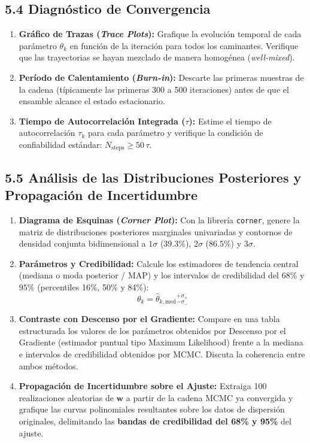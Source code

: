 \documentclass[11pt,a4paper]{article}
\begin{document}
\subsection{5.4 Diagnóstico de Convergencia}
\begin{enumerate}[leftmargin=*,itemsep=2pt]
    \item \textbf{Gráfico de Trazas (\textit{Trace Plots}):} Grafique la evolución temporal de cada parámetro $\theta_k$ en función de la iteración para todos los caminantes. Verifique que las trayectorias se hayan mezclado de manera homogénea (\textit{well-mixed}).
    \item \textbf{Período de Calentamiento (\textit{Burn-in}):} Descarte las primeras muestras de la cadena (típicamente las primeras 300 a 500 iteraciones) antes de que el ensamble alcance el estado estacionario.
    \item \textbf{Tiempo de Autocorrelación Integrada ($\tau$):} Estime el tiempo de autocorrelación $\tau_k$ para cada parámetro y verifique la condición de confiabilidad estándar: $N_{\text{steps}} \ge 50\,\tau$.
\end{enumerate}

\subsection{5.5 Análisis de las Distribuciones Posteriores y Propagación de Incertidumbre}
\begin{enumerate}[leftmargin=*,itemsep=3pt]
    \item \textbf{Diagrama de Esquinas (\textit{Corner Plot}):} Con la librería \texttt{corner}, genere la matriz de distribuciones posteriores marginales univariadas y contornos de densidad conjunta bidimensional a $1\sigma$ ($39.3\%$), $2\sigma$ ($86.5\%$) y $3\sigma$.
    \item \textbf{Parámetros y Credibilidad:} Calcule los estimadores de tendencia central (mediana o moda posterior / MAP) y los intervalos de credibilidad del $68\%$ y $95\%$ (percentiles 16\%, 50\% y 84\%):
    \begin{equation}
        \theta_k = \hat{\theta}_{k,\text{med}}{}_{-\sigma_-}^{+\sigma_+}
    \end{equation}
    \item \textbf{Contraste con Descenso por el Gradiente:} Compare en una tabla estructurada los valores de los parámetros obtenidos por Descenso por el Gradiente (estimador puntual tipo Maximum Likelihood) frente a la mediana e intervalos de credibilidad obtenidos por MCMC. Discuta la coherencia entre ambos métodos.
    \item \textbf{Propagación de Incertidumbre sobre el Ajuste:} Extraiga 100 realizaciones aleatorias de $\mathbf{w}$ a partir de la cadena MCMC ya convergida y grafique las curvas polinomiales resultantes sobre los datos de dispersión originales, delimitando las \textbf{bandas de credibilidad del 68\% y 95\%} del ajuste.
\end{enumerate}
\end{document}
